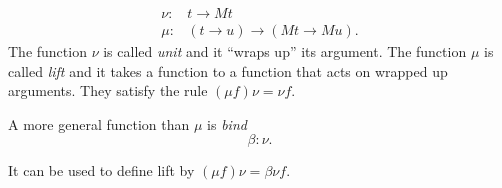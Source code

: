 \documentclass[12pt,letterpaper,fleqn]{report}
\begin{document}
\begin{align*}
	\nu\colon& t\to M t\\
	\mu\colon& (t\to u)\to (M t\to Mu).
\end{align*}
The function \(\nu\) is called {\em unit} and it ``wraps up'' its argument.
The function \(\mu\) is called {\em lift} and it takes a function to
a function that acts on wrapped up arguments.
They satisfy the rule \((\mu f)\nu = \nu f\).

A more general function than \(\mu\) is {\em bind}
\[
	\beta\colon \nu . 
\]

It can be used to define lift by
\((\mu f)\nu = \beta \nu f\).
\end{document}
